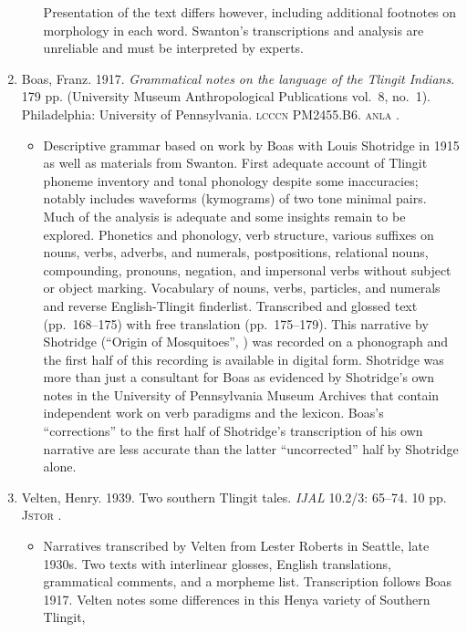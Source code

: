 \documentclass[12pt,letterpaper,oneside,article]{memoir}
\begin{document}
\begin{enumerate}
\begin{itemize}
		Presentation of the text differs however, including additional footnotes on
		morphology in each word.
		Swanton’s transcriptions and analysis are unreliable and must be interpreted
		by experts.
	\end{itemize}
\item	Boas, Franz.
	1917.
	\textit{Grammatical notes on the language of the Tlingit Indians}.
	179 pp.
	(University Museum Anthropological Publications vol.\ 8, no.\ 1).
	Philadelphia: University of Pennsylvania.
	\textsc{lcccn} PM2455.B6.
	\textsc{anla} .
	\begin{itemize}
	\item	Descriptive grammar based on work by Boas with  Louis Shotridge
		in 1915 as well as materials from Swanton.
		First adequate account of Tlingit phoneme inventory and tonal phonology
		despite some inaccuracies; notably includes waveforms (kymograms) of two tone
		minimal pairs.
		Much of the analysis is adequate and some insights remain to be explored. 
		Phonetics and phonology, verb structure, various suffixes on nouns,
		verbs, adverbs, and numerals, postpositions, relational nouns,
		compounding, pronouns, negation, and impersonal verbs without subject
		or object marking.
		Vocabulary of nouns, verbs, particles, and numerals and reverse
		English-Tlingit finderlist.
		Transcribed and glossed text (pp.\ 168–175)
		with free translation (pp.\ 175–179).
		This narrative by Shotridge (“Origin of Mosquitoes”, ) was
		recorded on a phonograph and the first half of this recording is available
		in digital form.
		Shotridge was more than just a consultant for Boas as evidenced by Shotridge’s
		own notes in the University of Pennsylvania Museum Archives that contain
		independent work on verb paradigms and the lexicon.
		Boas’s “corrections” to the first half of Shotridge’s transcription of his
		own narrative are less accurate than the latter “uncorrected” half by
		Shotridge alone.
	\end{itemize}
\item	Velten, Henry.
	1939.
	Two southern Tlingit tales.
	\textit{IJAL} 10.2/3: 65–74.
	10 pp.
	\textsc{Jstor} .
	\begin{itemize}
	\item	Narratives transcribed by Velten from  Lester Roberts in Seattle,
		late 1930s.
		Two texts with interlinear glosses, English translations, grammatical comments,
		and a morpheme list.
		Transcription follows Boas 1917.
		Velten notes some differences in this Henya variety of Southern Tlingit,

\end{itemize}
\end{enumerate}
\end{document}
